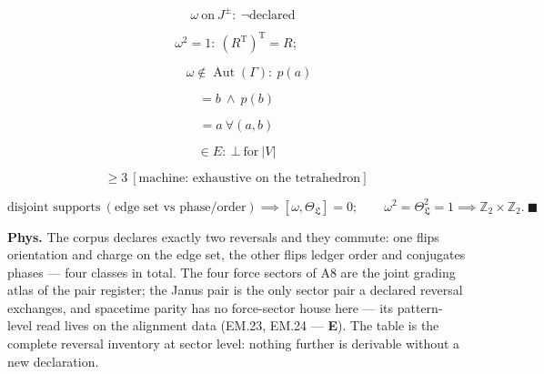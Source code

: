 \begin{theorem}
\[
\quad \omega\ \text{on}\ J^\pm:\ \neg\text{declared}
\]

\[
\omega^2=1:\ (R^{\mathrm T})^{\mathrm T}=R;
\]

\[
\qquad \omega\notin\operatorname{Aut}(\Gamma):\ p(a)
\]

\[
= b\ \wedge\ p(b)
\]

\[
= a\ \forall(a,b)
\]

\[
\in E:\ \bot\ \text{for}\ |V|
\]

\[
\ge 3\ [\text{machine: exhaustive on the tetrahedron}]
\]

\[
\text{disjoint supports}\ (\text{edge set vs phase/order})\implies[\omega,\Theta_{\mathfrak L}]=0;\qquad \omega^2=\Theta_{\mathfrak L}^2=1\implies\mathbb Z_2\times\mathbb Z_2.\ \blacksquare
\]

\textbf{Phys.} The corpus declares exactly two reversals and they commute: one flips orientation and charge on the edge set, the other flips ledger order and conjugates phases — four classes in total. The four force sectors of A8 are the joint grading atlas of the pair register; the Janus pair is the only sector pair a declared reversal exchanges, and spacetime parity has no force-sector house here — its pattern-level read lives on the alignment data (EM.23, EM.24 — \textbf{E}). The table is the complete reversal inventory at sector level: nothing further is derivable without a new declaration.

\end{theorem}

